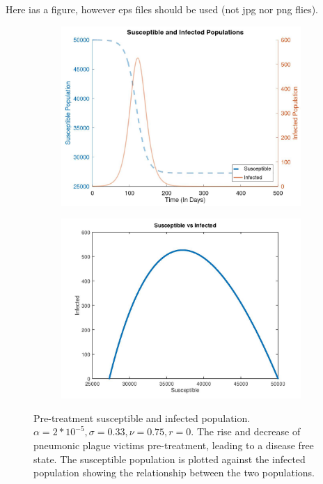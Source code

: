 \documentclass [letterpaper, 12pt] {article}
\begin{document}
Here ias a figure, however eps files should be used (not jpg nor png flies).
\begin{figure}[h!]
	\begin{subfigure}{0.48\textwidth}
		\includegraphics[width=\linewidth]{Figures/short_pneumonic.jpg}
	\end{subfigure}\hspace{\fill}
	\begin{subfigure}{0.48\textwidth}
		\includegraphics[width=\linewidth]{Figures/short_pneumonic2.jpg}
	\end{subfigure}
	\caption{Pre-treatment susceptible and infected population. $\alpha=2*10^{-5}, \sigma=0.33, \nu=0.75, r=0$.
	The rise and decrease of pneumonic plague victims pre-treatment, leading to a disease free state. The susceptible
	population is plotted against the infected population showing the relationship between the two populations.} 
\end{figure}
\end{document}
